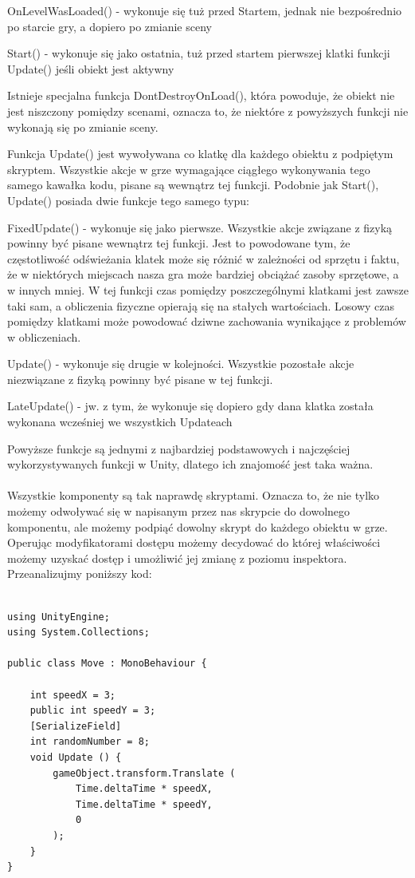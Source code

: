 \documentclass[12pt]{xmgr}
\begin{document}
OnLevelWasLoaded() - wykonuje się tuż przed Startem, jednak nie bezpośrednio po starcie gry, a dopiero po zmianie sceny

Start() - wykonuje się jako ostatnia, tuż przed startem pierwszej klatki funkcji Update() jeśli obiekt jest aktywny

Istnieje specjalna funkcja DontDestroyOnLoad(), która powoduje, że obiekt nie jest niszczony pomiędzy scenami, oznacza to, że niektóre z powyższych funkcji nie wykonają się po zmianie sceny.

Funkcja Update() jest wywoływana co klatkę dla każdego obiektu z podpiętym skryptem. Wszystkie akcje w grze wymagające ciągłego wykonywania tego samego kawałka kodu, pisane są wewnątrz tej funkcji. Podobnie jak Start(), Update() posiada dwie funkcje tego samego typu:

FixedUpdate() - wykonuje się jako pierwsze. Wszystkie akcje związane z fizyką powinny być pisane wewnątrz tej funkcji. Jest to powodowane tym, że częstotliwość odświeżania klatek może się różnić w zależności od sprzętu i faktu, że w niektórych miejscach nasza gra może bardziej obciążać zasoby sprzętowe, a w innych mniej. W tej funkcji czas pomiędzy poszczególnymi klatkami jest zawsze taki sam, a obliczenia fizyczne opierają się na stałych wartościach. Losowy czas pomiędzy klatkami może powodować dziwne zachowania wynikające z problemów w obliczeniach.

Update() - wykonuje się drugie w kolejności. Wszystkie pozostałe akcje niezwiązane z fizyką powinny być pisane w tej funkcji.

LateUpdate() - jw. z tym, że wykonuje się dopiero gdy dana klatka została wykonana wcześniej we wszystkich Updateach

Powyższe funkcje są jednymi z najbardziej podstawowych i najczęściej wykorzystywanych funkcji w Unity, dlatego ich znajomość jest taka ważna.
\\
\\
Wszystkie komponenty są tak naprawdę skryptami. Oznacza to, że nie tylko możemy odwoływać się w napisanym przez nas skrypcie do dowolnego komponentu, ale możemy podpiąć dowolny skrypt do każdego obiektu w grze. Operując modyfikatorami dostępu możemy decydować do której właściwości możemy uzyskać dostęp i umożliwić jej zmianę z poziomu inspektora. Przeanalizujmy poniższy kod:

\newpage
\begin{lstlisting}

using UnityEngine;
using System.Collections;

public class Move : MonoBehaviour {

	int speedX = 3;
	public int speedY = 3;
	[SerializeField]
	int randomNumber = 8;
	void Update () {
		gameObject.transform.Translate (
			Time.deltaTime * speedX, 
			Time.deltaTime * speedY,
			0
		);
	}
}
\end{lstlisting}
\end{document}
